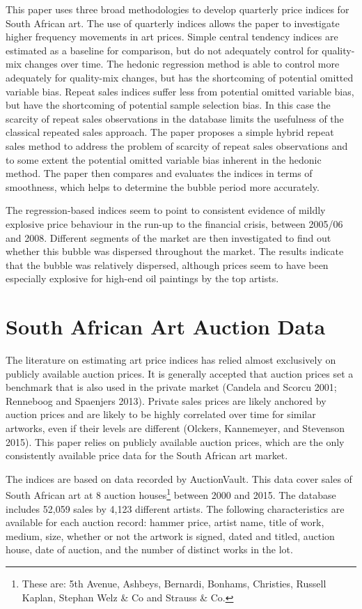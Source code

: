 \documentclass[]{elsarticle} %
\begin{document}
This paper uses three broad methodologies to develop quarterly price
indices for South African art. The use of quarterly indices allows the
paper to investigate higher frequency movements in art prices. Simple
central tendency indices are estimated as a baseline for comparison, but
do not adequately control for quality-mix changes over time. The hedonic
regression method is able to control more adequately for quality-mix
changes, but has the shortcoming of potential omitted variable bias.
Repeat sales indices suffer less from potential omitted variable bias,
but have the shortcoming of potential sample selection bias. In this
case the scarcity of repeat sales observations in the database limits
the usefulness of the classical repeated sales approach. The paper
proposes a simple hybrid repeat sales method to address the problem of
scarcity of repeat sales observations and to some extent the potential
omitted variable bias inherent in the hedonic method. The paper then
compares and evaluates the indices in terms of smoothness, which helps
to determine the bubble period more accurately.

The regression-based indices seem to point to consistent evidence of
mildly explosive price behaviour in the run-up to the financial crisis,
between 2005/06 and 2008. Different segments of the market are then
investigated to find out whether this bubble was dispersed throughout
the market. The results indicate that the bubble was relatively
dispersed, although prices seem to have been especially explosive for
high-end oil paintings by the top artists.

\section{South African Art Auction
Data}\label{south-african-art-auction-data}

The literature on estimating art price indices has relied almost
exclusively on publicly available auction prices. It is generally
accepted that auction prices set a benchmark that is also used in the
private market (Candela and Scorcu 2001; Renneboog and Spaenjers 2013).
Private sales prices are likely anchored by auction prices and are
likely to be highly correlated over time for similar artworks, even if
their levels are different (Olckers, Kannemeyer, and Stevenson 2015).
This paper relies on publicly available auction prices, which are the
only consistently available price data for the South African art market.

The indices are based on data recorded by AuctionVault. This data cover
sales of South African art at 8 auction houses\footnote{These are: 5th
  Avenue, Ashbeys, Bernardi, Bonhams, Christies, Russell Kaplan, Stephan
  Welz \& Co and Strauss \& Co.} between 2000 and 2015. The database
includes 52,059 sales by 4,123 different artists. The following
characteristics are available for each auction record: hammer price,
artist name, title of work, medium, size, whether or not the artwork is
signed, dated and titled, auction house, date of auction, and the number
of distinct works in the lot.
\end{document}
